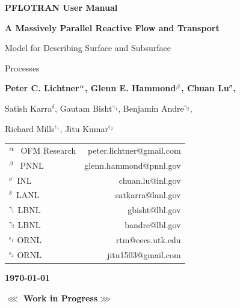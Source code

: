 \begin{center}

\dblline


{\bf\huge PFLOTRAN User Manual}

\vspace{0.5cm}

{\bf\LARGE A Massively Parallel Reactive Flow and Transport 

Model for Describing Surface and Subsurface 

Processes}

\vspace{0.5cm}

{\bf\large Peter C. Lichtner${^{\alpha}}$, Glenn E. Hammond${^{\beta}}$, Chuan Lu${^\sigma}$, 

Satish Karra${^\delta}$, Gautam Bisht$^{\gamma_1}$, Benjamin Andre$^{\gamma_2}$, 

Richard Mills$^{\epsilon_1}$, Jitu Kumar$^{\epsilon_2}$}

\vspace{0.5cm}

\begin{tabular}{lr}
$^{{\alpha}_{~}}$ OFM Research & peter.lichtner@gmail.com\\
$^{{\beta}_{~}}$ PNNL & glenn.hammond@pnnl.gov\\
$^{\sigma_{~}}$ INL & chuan.lu@inl.gov\\
$^{\delta_{~}}$ LANL & satkarra@lanl.gov\\
$^{\gamma_1^{}}$ LBNL & gbisht@lbl.gov\\
$^{\gamma_2^{}}$ LBNL & bandre@lbl.gov\\
$^{\epsilon_1^{}}$ ORNL & rtm@eecs.utk.edu \\
$^{\epsilon_2^{}}$ ORNL & jitu1503@gmail.com
\end{tabular}

\vspace{0.5cm}

{\bf\large\today}


\vspace{1cm}

{\bf\LARGE $\lll$ Work in Progress$\ggg$}

\vspace{1cm}

\end{center}


